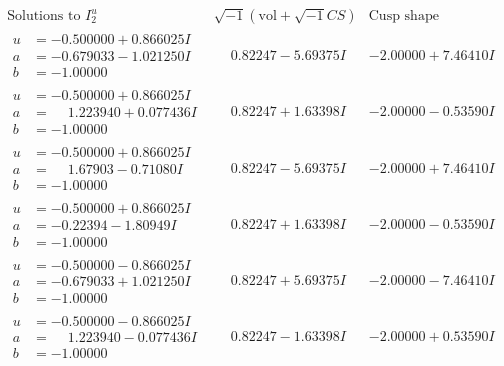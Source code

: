 \documentclass[1p]{elsarticle_modified}
\theoremstyle{definition}
\newcommand{\I}{\sqrt{-1}}
\begin{document}
$$\begin{array}{c|c|c}  
\text{Solutions to }I^u_{2}& \I (\text{vol} + \sqrt{-1}CS) & \text{Cusp shape}\\
 \hline 
\begin{aligned}
u &= -0.500000 + 0.866025 I \\
a &= -0.679033 - 1.021250 I \\
b &= -1.00000\phantom{ +0.000000I}\end{aligned}
 & \phantom{-}0.82247 - 5.69375 I & -2.00000 + 7.46410 I \\ \hline\begin{aligned}
u &= -0.500000 + 0.866025 I \\
a &= \phantom{-}1.223940 + 0.077436 I \\
b &= -1.00000\phantom{ +0.000000I}\end{aligned}
 & \phantom{-}0.82247 + 1.63398 I & -2.00000 - 0.53590 I \\ \hline\begin{aligned}
u &= -0.500000 + 0.866025 I \\
a &= \phantom{-}1.67903 - 0.71080 I \\
b &= -1.00000\phantom{ +0.000000I}\end{aligned}
 & \phantom{-}0.82247 - 5.69375 I & -2.00000 + 7.46410 I \\ \hline\begin{aligned}
u &= -0.500000 + 0.866025 I \\
a &= -0.22394 - 1.80949 I \\
b &= -1.00000\phantom{ +0.000000I}\end{aligned}
 & \phantom{-}0.82247 + 1.63398 I & -2.00000 - 0.53590 I \\ \hline\begin{aligned}
u &= -0.500000 - 0.866025 I \\
a &= -0.679033 + 1.021250 I \\
b &= -1.00000\phantom{ +0.000000I}\end{aligned}
 & \phantom{-}0.82247 + 5.69375 I & -2.00000 - 7.46410 I \\ \hline\begin{aligned}
u &= -0.500000 - 0.866025 I \\
a &= \phantom{-}1.223940 - 0.077436 I \\
b &= -1.00000\phantom{ +0.000000I}\end{aligned}
 & \phantom{-}0.82247 - 1.63398 I & -2.00000 + 0.53590 I \\ \hline\begin{aligned}

\end{aligned}
\end{array}$$
\end{document}
